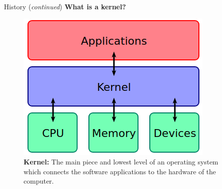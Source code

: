 \documentclass[11pt]{beamer}
\begin{document}
\begin{frame}{History (\textit{continued})}
	\centering\textbf{\LARGE What is a kernel?}
	\begin{figure}
		\includegraphics[scale=0.40]{os-diagram.png}
		\caption{\textbf{Kernel:} The main piece and lowest level of an operating system which connects the software applications to the hardware of the computer.}
	\end{figure}
\end{frame}
\end{document}
